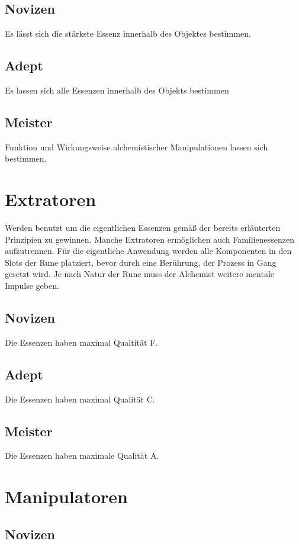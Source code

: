 \documentclass[a4paper,12pt,oneside]{book}
\begin{document}
\subsection{Novizen}
Es lässt sich die stärkste Essenz innerhalb des Objektes bestimmen.

\subsection{Adept}
Es lassen sich alle Essenzen innerhalb des Objekts bestimmen

\subsection{Meister}
Funktion und Wirkungsweise alchemistischer Manipulationen lassen sich bestimmen.

\section{Extratoren}
Werden benutzt um die eigentlichen Essenzen gemäß der bereits erläuterten Prinzipien zu gewinnen. Manche Extratoren ermöglichen auch Familienessenzen aufzutrennen. Für die eigentliche Anwendung werden alle Komponenten in den Slots der Rune platziert, bevor durch eine Berührung, der Prozess in Gang gesetzt wird. Je nach Natur der Rune muss der Alchemist weitere mentale Impulse geben.

\subsection{Novizen}
Die Essenzen haben maximal Qualtität F.

\subsection{Adept}
Die Essenzen haben maximal Qualität C.

\subsection{Meister}
Die Essenzen haben maximale Qualität A.

\section{Manipulatoren}

\subsection{Novizen}
\end{document}
